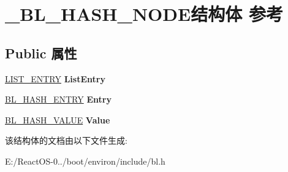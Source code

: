 \hypertarget{struct___b_l___h_a_s_h___n_o_d_e}{}\section{\+\_\+\+B\+L\+\_\+\+H\+A\+S\+H\+\_\+\+N\+O\+D\+E结构体 参考}
\label{struct___b_l___h_a_s_h___n_o_d_e}
\subsection*{Public 属性}
\begin{DoxyCompactItemize}
\item 
\mbox{\label{struct___b_l___h_a_s_h___n_o_d_e_a4c0f4a6e319f34b3c2d713010f11978d}} 
\hyperlink{struct___l_i_s_t___e_n_t_r_y}{L\+I\+S\+T\+\_\+\+E\+N\+T\+RY} {\bfseries List\+Entry}
\item 
\mbox{\label{struct___b_l___h_a_s_h___n_o_d_e_a9b4207f35280e8ac6cd8ede4fa7432fe}} 
\hyperlink{struct___b_l___h_a_s_h___e_n_t_r_y}{B\+L\+\_\+\+H\+A\+S\+H\+\_\+\+E\+N\+T\+RY} {\bfseries Entry}
\item 
\mbox{\label{struct___b_l___h_a_s_h___n_o_d_e_a9d6eac917a42cdccea834f88db7376f0}} 
\hyperlink{struct___b_l___h_a_s_h___v_a_l_u_e}{B\+L\+\_\+\+H\+A\+S\+H\+\_\+\+V\+A\+L\+UE} {\bfseries Value}
\end{DoxyCompactItemize}


该结构体的文档由以下文件生成\+:\begin{DoxyCompactItemize}
\item 
E\+:/\+React\+O\+S-\/0../boot/environ/include/bl.\+h\end{DoxyCompactItemize}
